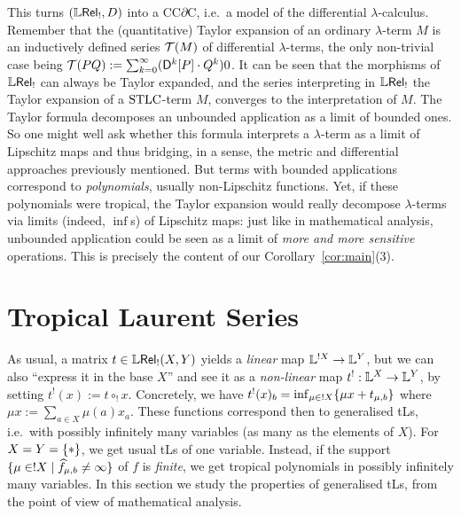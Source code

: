 \documentclass[submission,%
]{eptcs}
\begin{document}
This turns $(\mathbb{L} \mathsf{Rel}_!,D)$ into a CC$\partial$C, i.e.\ a model of the differential $\lambda$-calculus.
Remember that the (quantitative) Taylor expansion of an ordinary $\lambda$-term $M$ is an inductively defined series $\mathcal{T}(M)$ of differential $\lambda$-terms, the only non-trivial case being $\mathcal{T}(PQ) :=  \sum_{k=0}^{\infty} (\mathsf{D}^{k}[P] \cdot Q^{k})0$.
It can be seen that the morphisms of $\mathbb{L} \mathsf{Rel}_!$ can always be Taylor expanded, and the series interpreting in $\mathbb{L} \mathsf{Rel}_!$ the Taylor expansion of a $\mathrm{STLC}$-term $M$, converges to the interpretation of $M$.
The Taylor formula decomposes an unbounded application as a limit of bounded ones.
So one might well ask whether this formula interprets a $\lambda$-term 
as a limit of Lipschitz maps and thus bridging, in a sense, the metric and differential approaches previously mentioned.  
But terms with bounded applications correspond to \emph{polynomials}, usually non-Lipschitz functions. 
Yet, if these polynomials were tropical, the Taylor expansion would really decompose $\lambda$-terms via limits (indeed, $\inf$s) of Lipschitz maps: just like in mathematical analysis, unbounded application could be seen 
as a limit of \emph{more and more sensitive} operations.
This is precisely the content of our Corollary~\ref{cor:main}(3).

\section{Tropical Laurent Series}

 As usual, a matrix $t\in{\mathbb{L}\mathsf{Rel}_!}(X,Y)$ yields a \emph{linear} map $\mathbb{L}^{!X}\to\mathbb{L}^Y$, but we can also ``express it in the base $X$'' and see it as a \emph{non-linear} map $t^!:\mathbb{L}^X\to\mathbb{L}^Y$, by setting 
 $t^!(x):=t\circ_! x$.
 Concretely, we have $t^!(x)_b=\inf_{\mu\in !X} \{\mu x+ t_{\mu,b}\}$
 where $\mu x:=\sum_{a\in X} \mu(a)x_a$.
 These functions correspond then to generalised tLs, i.e.\ with possibly infinitely many variables (as many as the elements of $X$).
For $X=Y=\{*\}$, we get usual tLs of one variable.
Instead, if the support $\{\mu\in!X\mid\widehat{f}_{\mu,b}\neq\infty\}$ of $f$ is \emph{finite}, we get %
tropical polynomials in possibly infinitely many variables.
In this section we study the properties of generalised tLs, from the point of view of mathematical analysis.
 
\end{document}
